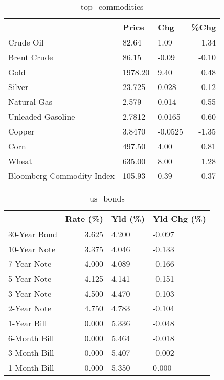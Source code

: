 \documentclass{article}%
\begin{document}
\begin{table}[htbp]%
\caption{top\_commodities}%
\centering%
\begin{adjustbox}{width=1\textwidth}%
\begin{tabular}{lllr}
\toprule
                          &   Price &     Chg &  \%Chg \\
\midrule
               Crude Oil  &   82.64 &    1.09 &  1.34 \\
             Brent Crude  &   86.15 &   -0.09 & -0.10 \\
                    Gold  & 1978.20 &    9.40 &  0.48 \\
                  Silver  &  23.725 &   0.028 &  0.12 \\
             Natural Gas  &   2.579 &   0.014 &  0.55 \\
       Unleaded Gasoline  &  2.7812 &  0.0165 &  0.60 \\
                  Copper  &  3.8470 & -0.0525 & -1.35 \\
                    Corn  &  497.50 &    4.00 &  0.81 \\
                   Wheat  &  635.00 &    8.00 &  1.28 \\
Bloomberg Commodity Index &  105.93 &    0.39 &  0.37 \\
\bottomrule
\end{tabular}
%
\end{adjustbox}%
\end{table}

%


\begin{table}[htbp]%
\caption{us\_bonds}%
\centering%
\begin{adjustbox}{width=1\textwidth}%
\begin{tabular}{lrll}
\toprule
             &  Rate (\%) & Yld (\%) & Yld Chg (\%) \\
\midrule
30-Year Bond &     3.625 &   4.200 &      -0.097 \\
10-Year Note &     3.375 &   4.046 &      -0.133 \\
 7-Year Note &     4.000 &   4.089 &      -0.166 \\
 5-Year Note &     4.125 &   4.141 &      -0.151 \\
 3-Year Note &     4.500 &   4.470 &      -0.103 \\
 2-Year Note &     4.750 &   4.783 &      -0.104 \\
 1-Year Bill &     0.000 &   5.336 &      -0.048 \\
6-Month Bill &     0.000 &   5.464 &      -0.018 \\
3-Month Bill &     0.000 &   5.407 &      -0.002 \\
1-Month Bill &     0.000 &   5.350 &       0.000 \\
\bottomrule
\end{tabular}
%
\end{adjustbox}%
\end{table}
\end{document}
